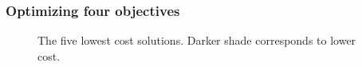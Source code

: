 \begin{frame}
    \frametitle{Optimizing four objectives}

    \begin{figure}
        \centering 
        \resizebox{0.9\columnwidth}{!}{}
        \caption{The five lowest cost solutions. Darker shade corresponds to lower cost.}
        \label{fig:4-obj-design-space-total-cost}
    \end{figure}

\end{frame}